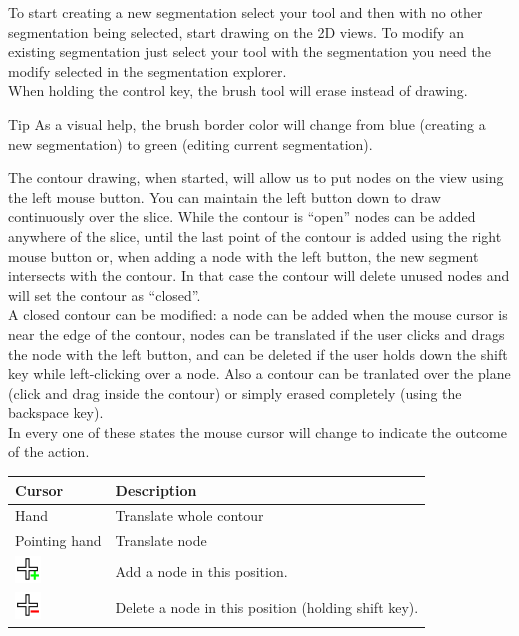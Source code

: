 To start creating a new segmentation select your tool and then with no other
segmentation being selected, start drawing on the 2D views. To modify an existing
segmentation just select your tool with the segmentation you need the modify 
selected in the segmentation explorer.\\
When holding the control key, the brush tool will erase instead of drawing.\\

\vspace{0.3cm}
\begin{bclogo}[couleur = yellow!33, logo= \bcbook]
{Tip} As a visual help, the brush border color will change from blue (creating a
new segmentation) to green (editing current segmentation). 
\end{bclogo}
\vspace{0.3cm}

The contour drawing, when started, will allow us to put nodes on the view using the left
mouse button. You can maintain the left button down to draw continuously over the slice.
While the contour is ``open'' nodes can be added anywhere of the slice, until the last point
of the contour is added using the right mouse button or, when adding a node with the left
button, the new segment intersects with the contour. In that case the contour will delete
unused nodes and will set the contour as ``closed''.\\
A closed contour can be modified: a node can be added when the mouse cursor is near the edge
of the contour, nodes can be translated if the user clicks and drags the node with the left
button, and can be deleted if the user holds down the shift key while left-clicking over a node.
Also a contour can be tranlated over the plane (click and drag inside the contour) or simply
erased completely (using the backspace key).\\
In every one of these states the mouse cursor will change to indicate the outcome of the action.
\vspace{0.3cm}

\begin{tabular}{| m{1.3cm} | m{12cm} |}
\hline
\textbf{Cursor} & \textbf{Description}\\
\hline
Hand & Translate whole contour\\
\hline
Pointing hand & Translate node\\
\hline
\includegraphics[width=0.7cm]{../../frontend/rsc/cross-plus} & Add a node in this position.\\
\hline
\includegraphics[width=0.7cm]{../../frontend/rsc/cross-minus} & Delete a node in this position (holding shift key).\\
\hline
\end{tabular}
\vspace{0.3cm}

